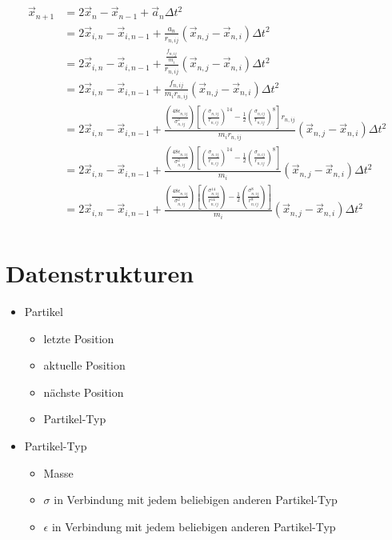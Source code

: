 \documentclass{article}
\begin{document}
\begin{align}
	\vec{x}_{n+1}&=2\vec{x}_n-\vec{x}_{n-1}+\vec{a}_n\Delta t^2\\
	&=2\vec{x}_{i,n}-\vec{x}_{i,n-1}+\frac{a_n}{r_{n,ij}}\left(\vec{x}_{n,j}-\vec{x}_{n,i}\right)\Delta t^2\\
	&=2\vec{x}_{i,n}-\vec{x}_{i,n-1}+\frac{\frac{f_{n,ij}}{m_i}}{r_{n,ij}}\left(\vec{x}_{n,j}-\vec{x}_{n,i}\right)\Delta t^2\\
	&=2\vec{x}_{i,n}-\vec{x}_{i,n-1}+\frac{f_{n,ij}}{m_ir_{n,ij}}\left(\vec{x}_{n,j}-\vec{x}_{n,i}\right)\Delta t^2\\
	&=2\vec{x}_{i,n}-\vec{x}_{i,n-1}+\frac{\left(\frac{48\epsilon_{n,ij}}{\sigma_{n,ij}^2}\right)\left[\left(\frac{\sigma_{n,ij}}{r_{n,ij}}\right)^{14}-\frac{1}{2}\left(\frac{\sigma_{n,ij}}{r_{n,ij}}\right)^8\right]r_{n,ij}}{m_ir_{n,ij}}\left(\vec{x}_{n,j}-\vec{x}_{n,i}\right)\Delta t^2\\
	&=2\vec{x}_{i,n}-\vec{x}_{i,n-1}+\frac{\left(\frac{48\epsilon_{n,ij}}{\sigma_{n,ij}^2}\right)\left[\left(\frac{\sigma_{n,ij}}{r_{n,ij}}\right)^{14}-\frac{1}{2}\left(\frac{\sigma_{n,ij}}{r_{n,ij}}\right)^8\right]}{m_i}\left(\vec{x}_{n,j}-\vec{x}_{n,i}\right)\Delta t^2\\
	&=2\vec{x}_{i,n}-\vec{x}_{i,n-1}+\frac{\left(\frac{48\epsilon_{n,ij}}{\sigma_{n,ij}^2}\right)\left[\left(\frac{\sigma_{n,ij}^{14}}{r_{n,ij}^{14}}\right)-\frac{1}{2}\left(\frac{\sigma_{n,ij}^8}{r_{n,ij}^8}\right)\right]}{m_i}\left(\vec{x}_{n,j}-\vec{x}_{n,i}\right)\Delta t^2\\
\end{align}

\section*{Datenstrukturen}
\begin{itemize}
	\item Partikel
	\begin{itemize}
		\item letzte     Position
		\item aktuelle Position
		\item nächste Position
		\item Partikel-Typ
	\end{itemize}
	\item Partikel-Typ
	\begin{itemize}
		\item Masse
		\item $\sigma$ in Verbindung mit jedem beliebigen anderen Partikel-Typ
		\item $\epsilon$ in Verbindung mit jedem beliebigen anderen Partikel-Typ
	\end{itemize}
\end{itemize}
\end{document}
